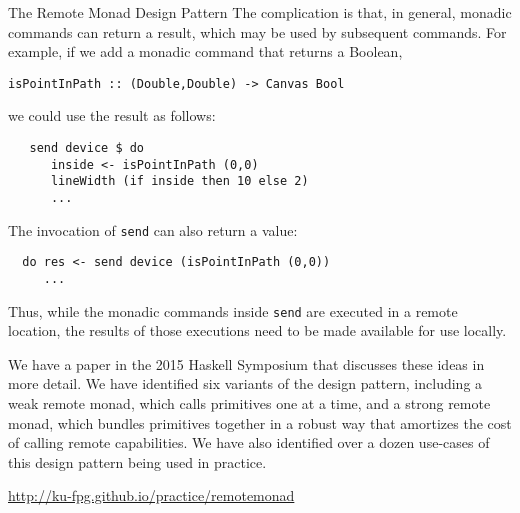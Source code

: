 \begin{hcarentry}[new]{The Remote Monad Design Pattern}
The complication is that, in general, monadic commands can return a
result, which may be used by subsequent commands.  For example, if we
add a monadic command that returns a Boolean,

{\footnotesize
\begin{verbatim}
isPointInPath :: (Double,Double) -> Canvas Bool
\end{verbatim}
}

we could use the result as follows:

{\footnotesize
\begin{verbatim}
   send device $ do
      inside <- isPointInPath (0,0)
      lineWidth (if inside then 10 else 2)
      ...
\end{verbatim}
}

The invocation of \verb`send` can also return a value:

{\footnotesize
\begin{verbatim}
  do res <- send device (isPointInPath (0,0))
     ...
\end{verbatim}
}

Thus, while the monadic commands inside \verb`send` are executed in a
remote location, the results of those executions need to be made
available for use locally. 

We have a paper in the 2015 Haskell Symposium that discusses these ideas in more detail.
We have identified six variants of the design pattern, including
a weak remote monad, which calls primitives one at a time, and
a strong remote monad, which bundles primitives together in a robust way that
amortizes the cost of calling remote capabilities.
We have also identified over a dozen use-cases of this design pattern being used in practice. 

\FurtherReading
  \url{http://ku-fpg.github.io/practice/remotemonad}
\end{hcarentry}
